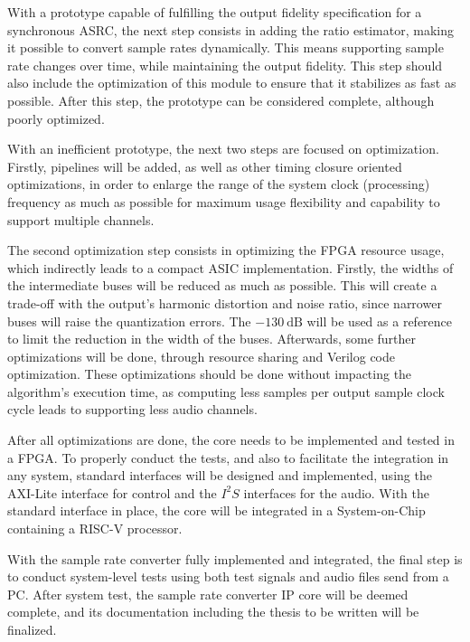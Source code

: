 With a prototype capable of fulfilling the output fidelity specification for a
synchronous ASRC, the next step consists in adding the ratio estimator, making
it possible to convert sample rates dynamically. This means supporting sample rate
changes over time, while maintaining the output fidelity. This step
should also include the optimization of this module to ensure that it stabilizes
as fast as possible. After this step, the prototype can be considered complete,
although poorly optimized.

With an inefficient prototype, the next two steps are focused on optimization.
Firstly, pipelines will be added, as well as other timing closure oriented
optimizations, in order to enlarge the range of the system clock (processing)
frequency as much as possible for maximum usage flexibility and capability to
support multiple channels.

The second optimization step consists in optimizing the FPGA resource usage,
which indirectly leads to a compact ASIC implementation. Firstly, the widths of
the intermediate buses will be reduced as much as possible. This will create a
trade-off with the output's harmonic distortion and noise ratio, since narrower
buses will raise the quantization errors. The $\SI{-130}{\dB}$ will be used as
a reference to limit the reduction in the width of the buses. Afterwards, some
further optimizations will be done, through resource sharing and Verilog code
optimization. These optimizations should be done without impacting the
algorithm's execution time, as computing less samples per output sample clock
cycle leads to supporting less audio channels.

After all optimizations are done, the core needs to be implemented and tested in
a FPGA. To properly conduct the tests, and also to facilitate the integration in
any system, standard interfaces will be designed and implemented, using the
AXI-Lite interface for control and the $I^2S$ interfaces for the audio. With the
standard interface in place, the core will be integrated in a System-on-Chip
containing a RISC-V processor.

With the sample rate converter fully implemented and integrated, the final step
is to conduct system-level tests using both test signals and audio files send
from a PC. After system test, the sample rate converter IP core will be deemed
complete, and its documentation including the thesis to be written will be
finalized.
